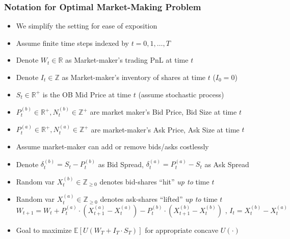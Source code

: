 \documentclass[handout]{beamer}
\begin{document}
\begin{frame}
\frametitle{Notation for Optimal Market-Making Problem}
\pause
\begin{itemize}[<+->]
\item We simplify the setting for ease of exposition
\item Assume finite time steps indexed by $t= 0, 1, \ldots, T$
\item Denote $W_t \in \mathbb{R}$ as Market-maker's trading PnL at time $t$
\item Denote $I_t \in \mathbb{Z}$ as Market-maker's inventory of shares at time $t$ ($I_0 = 0$)
\item $S_t \in \mathbb{R}^+$ is the OB Mid Price at time $t$ (assume stochastic process)
\item $P_t^{(b)} \in \mathbb{R}^+, N_t^{(b)} \in \mathbb{Z}^+$ are market maker's Bid Price, Bid Size at time $t$
\item $P_t^{(a)} \in \mathbb{R}^+, N_t^{(a)} \in \mathbb{Z}^+$ are market-maker's Ask Price, Ask Size at time $t$
\item Assume market-maker can add or remove bids/asks costlessly
\item Denote $\delta_t^{(b)} = S_t - P_t^{(b)}$ as Bid Spread, $\delta_t^{(a)} = P_t^{(a)} - S_t$ as Ask Spread
\item Random var $X_t^{(b)} \in \mathbb{Z}_{\geq 0}$ denotes bid-shares ``hit'' {\em up to} time $t$
\item Random var $X_t^{(a)} \in \mathbb{Z}_{\geq 0}$ denotes ask-shares ``lifted'' {\em up to} time $t$
$$W_{t+1} = W_t + P_t^{(a)} \cdot (X_{t+1}^{(a)} - X_t^{(a)}) - P_t^{(b)} \cdot (X_{t+1}^{(b)} - X_t^{(b)}) \mbox{ , } I_t = X_t^{(b)} - X_t^{(a)}$$
\item Goal to maximize $\mathbb{E}[U(W_T + I_T \cdot S_T)]$ for appropriate concave $U(\cdot)$
\end{itemize}
\end{frame}
\end{document}
